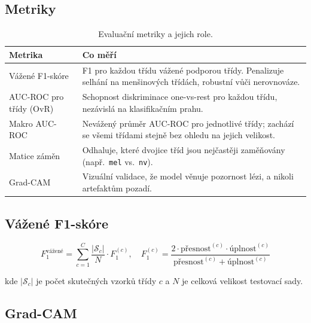 \documentclass[12pt, a4paper]{article}
\begin{document}
\subsection{Metriky}

\begin{table}[H]
    \centering
    \caption{Evaluační metriky a jejich role.}
    \begin{tabular}{lp{9cm}}
        \toprule
        \textbf{Metrika} & \textbf{Co měří} \\
        \midrule
        Vážené F1-skóre
            & F1 pro každou třídu vážené podporou třídy.
              Penalizuje selhání na menšinových třídách,
              robustní vůči nerovnováze. \\
        AUC-ROC pro třídy (OvR)
            & Schopnost diskriminace one-vs-rest pro každou třídu,
              nezávislá na klasifikačním prahu. \\
        Makro AUC-ROC
            & Nevážený průměr AUC-ROC pro jednotlivé třídy;
              zachází se všemi třídami stejně bez ohledu na jejich velikost. \\
        Matice záměn
            & Odhaluje, které dvojice tříd jsou nejčastěji zaměňovány
              (např.\ \texttt{mel} vs.\ \texttt{nv}). \\
        Grad-CAM
            & Vizuální validace, že model věnuje pozornost lézi,
              a nikoli artefaktům pozadí. \\
        \bottomrule
    \end{tabular}
    \label{tab:metrics}
\end{table}

\subsection{Vážené F1-skóre}

\begin{equation}
    F_1^{\text{vážené}} = \sum_{c=1}^{C}
        \frac{|\mathcal{S}_c|}{N} \cdot F_1^{(c)}, \quad
    F_1^{(c)} = \frac{2 \cdot \text{přesnost}^{(c)} \cdot \text{úplnost}^{(c)}}
                     {\text{přesnost}^{(c)} + \text{úplnost}^{(c)}}
    \label{eq:f1}
\end{equation}

kde $|\mathcal{S}_c|$ je počet skutečných vzorků třídy $c$ a
$N$ je celková velikost testovací sady.

\subsection{Grad-CAM}
\end{document}
